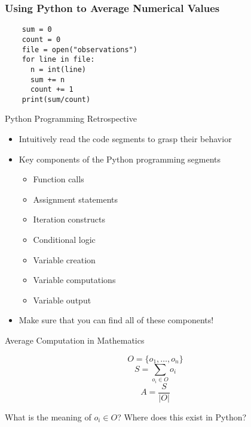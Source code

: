 \documentclass[14pt,aspectratio=169]{beamer}
\begin{document}
%
\begin{frame}[fragile]
  \frametitle{Using Python to Average Numerical Values}
  \hspace*{-.6in}
  \begin{minipage}{6in}
    \begin{verbatim}
    sum = 0
    count = 0
    file = open("observations")
    for line in file:
      n = int(line)
      sum += n
      count += 1
    print(sum/count)
    \end{verbatim}
  \end{minipage}
\end{frame}

%
\begin{frame}{Python Programming Retrospective}
  \begin{itemize}
    \item Intuitively read the code segments to grasp their behavior
      \vspace*{-.15in}
    \item Key components of the Python programming segments
      \begin{itemize}
        \item Function calls
        \item Assignment statements
        \item Iteration constructs
        \item Conditional logic
        \item Variable creation
        \item Variable computations
        \item Variable output
      \end{itemize}
      \vspace*{-.2in}
    \item Make sure that you can find all of these components!
  \end{itemize}
\end{frame}

%
\begin{frame}{Average Computation in Mathematics}
  \vspace*{-.5in}
  \begin{center}
  \fontsize{20}{30}\selectfont
    \begin{equation*}
     O = \{o_1, \ldots, o_n\}
    \end{equation*}
    \begin{equation*}
      S = \sum_{o_i \in O} o_i
    \end{equation*}
    \begin{equation*}
      A = \frac{S}{|O|}
    \end{equation*}
  \end{center}
  \vspace{2ex}
  \begin{center}
    \small What is the meaning of $o_i \in O$? Where does this exist in Python?
  \end{center}
\end{frame}
\end{document}

